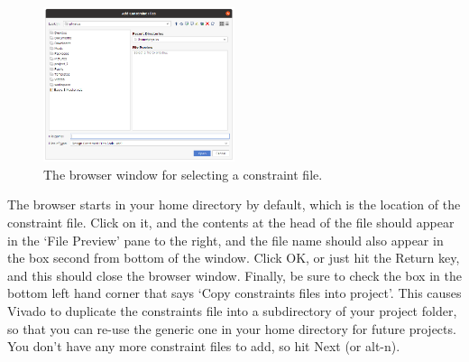 \documentclass[../physical_computing.tex]{subfiles}
\begin{document}
\begin{figure}[htbp]
    \centering
    \includegraphics[width=0.5\textwidth]{chapter_1/figures/add_constraint_file.png}
    \caption{The browser window for selecting a constraint file.}
    \label{fig:add_constraint_file}
\end{figure}

The browser starts in your home directory by default, which is the location of the constraint file. Click on it, and the contents at the head of the file should appear in the `File Preview' pane to the right, and the file name should also appear in the box second from bottom of the window. Click OK, or just hit the Return key, and this should close the browser window. Finally, be sure to check the box in the bottom left hand corner that says `Copy constraints files into project'. This causes Vivado to duplicate the constraints file into a subdirectory of your project folder, so that you can re-use the generic one in your home directory for future projects. You don't have any more constraint files to add, so hit Next (or alt-n).
\end{document}
